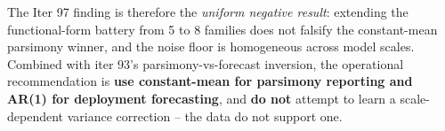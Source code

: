 The Iter 97 finding is therefore the \emph{uniform negative result}:
extending the functional-form battery from 5 to 8 families does not
falsify the constant-mean parsimony winner, and the noise floor is
homogeneous across model scales.  Combined with iter 93's
parsimony-vs-forecast inversion, the operational recommendation is
\textbf{use constant-mean for parsimony reporting and AR(1) for
deployment forecasting}, and \textbf{do not} attempt to learn a
scale-dependent variance correction -- the data do not support one.